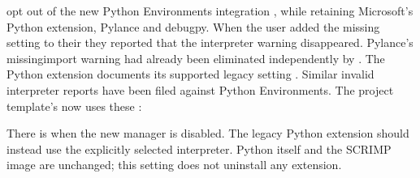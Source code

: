 \documentclass[letterpaper,10pt,english]{sphinxmanual}
\begin{document}
\sphinxAtStartPar
{} opt out of the
new Python Environments integration ,
while retaining Microsoft’s Python extension, Pylance and debugpy.
When the user added the missing
 setting to their
 they reported that the interpreter
warning disappeared. Pylance’s missing\sphinxhyphen{}import warning had
already been eliminated independently by .
The Python extension documents its supported legacy setting
. Similar invalid
interpreter reports have been filed against Python Environments.
The project template’s 
now uses these :

\begin{sphinxVerbatim}[commandchars=\\\{\}]
\PYG{p}{[}\PYG{p}{],}
\end{sphinxVerbatim}

\sphinxAtStartPar
There is  
when the new manager is disabled. The legacy Python extension
should instead use the explicitly selected interpreter.
Python itself and the SCRIMP image are unchanged; this setting
does not uninstall any extension.
\end{document}
